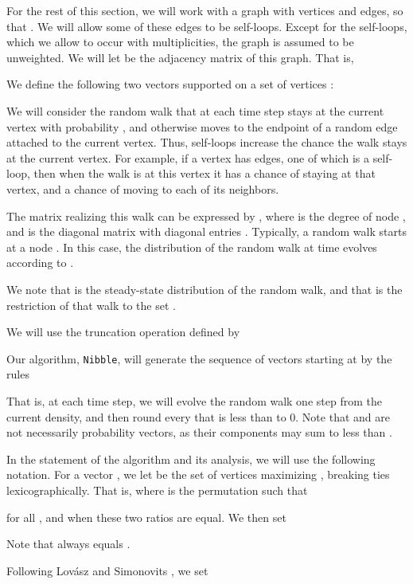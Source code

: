 \documentclass[11pt]{article}
\begin{document}
For the rest of this section, we will work with a graph
   with  vertices and  edges, so that
  .
We will allow some of these edges to be self-loops.
Except for the self-loops, which we allow to occur with multiplicities,
  the graph is assumed to be unweighted.
We will let  be the adjacency matrix of this graph.
That is,


We define the following two vectors supported on a set of vertices :


We will consider the random walk
  that at each time step stays at the current vertex with probability ,
  and otherwise moves to the endpoint of a random edge attached
  to the current vertex.
Thus, self-loops increase the chance the walk stays at the current vertex.
For example, if a vertex has  edges, one of which is a self-loop,
  then when the walk is at this vertex it has a  chance of staying
  at that vertex, and a  chance of moving to each of its  neighbors.

The matrix realizing this walk can be expressed by
 ,
  where
   is the degree of node ,
  and  is the diagonal matrix with diagonal entries
  .
Typically, a random walk starts at a node .
In this case, the distribution of the random walk at time 
  evolves according to .

We note that  is the steady-state distribution of the
  random walk, and that  is the restriction
  of that walk to the set .




We will use the truncation operation defined by



Our algorithm, \texttt{Nibble}, will generate the sequence of
  vectors starting at  by the rules



That is, at each time step, we will evolve the random walk one
  step from the current density, and then round every 
  that is less than  to 0.
Note that  and  are not necessarily probability vectors,
  as their components may sum to less than .

In the statement of the algorithm and its analysis, we will use the
  following notation.
For a vector , we let  be the set of  vertices 
  maximizing , breaking ties lexicographically.
That is, 
  where   is the permutation  such that

  for all ,
  and  when these two ratios are equal.
We then set

Note that  always equals .

Following Lov\'asz and Simonovits \cite{LovaszSimonovitsFOCS}, we set
\end{document}
